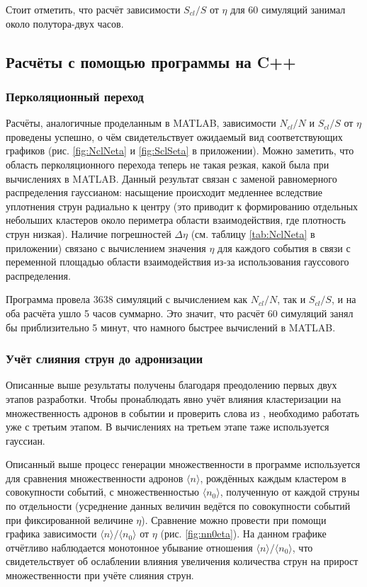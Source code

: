 Стоит отметить, что расчёт зависимости $S_{cl}/S$ от $\eta$ для 60 симуляций занимал около полутора-двух часов.
\subsection{Расчёты с помощью программы на C++}
\subsubsection{Перколяционный переход}
Расчёты, аналогичные проделанным в MATLAB, зависимости $N_{cl}/N$ и $S_{cl}/S$ от $\eta$ проведены успешно, о чём свидетельствует ожидаемый вид соответствующих графиков (рис. \ref{fig:NclNeta} и \ref{fig:SclSeta} в приложении). Можно заметить, что область перколяционного перехода теперь не такая резкая, какой была при вычислениях в MATLAB. Данный результат связан с заменой равномерного распределения гауссианом: насыщение происходит медленнее вследствие уплотнения струн радиально к центру (это приводит к формированию отдельных небольших кластеров около периметра области взаимодействия, где плотность струн низкая). Наличие погрешностей $\Delta \eta$ (см. таблицу \ref{tab:NclNeta} в приложении) связано с вычислением значения $\eta$ для каждого события в связи с переменной площадью области взаимодействия из-за использования гауссового распределения.

Программа провела 3638 симуляций с вычислением как $N_{cl}/N$, так и $S_{cl}/S$, и на оба расчёта ушло 5 часов суммарно. Это значит, что расчёт 60 симуляций занял бы приблизительно 5 минут, что намного быстрее вычислений в MATLAB. 
\subsubsection{Учёт слияния струн до адронизации}
Описанные выше результаты получены благодаря преодолению первых двух этапов разработки. Чтобы пронаблюдать явно учёт влияния кластеризации на множественность адронов в событии и проверить слова из \cite{MulReduction}, необходимо работать уже с третьим этапом. В вычислениях на третьем этапе таже используется гауссиан.

Описанный выше процесс генерации множественности в программе используется для сравнения множественности адронов $\langle n \rangle$, рождённых каждым кластером в совокупности событий, с множественностью $\langle n_0 \rangle$, полученную от каждой струны по отдельности (усреднение данных величин ведётся по совокупности событий при фиксированной величине $\eta$). Сравнение можно провести при помощи графика зависимости $\langle n \rangle / \langle n_0 \rangle$ от $\eta$ (рис. \ref{fig:nn0eta}). На данном графике отчётливо наблюдается монотонное убывание отношения $\langle n \rangle / \langle n_0 \rangle$, что свидетельствует об ослаблении влияния увеличения количества струн на прирост множественности при учёте слияния струн.

